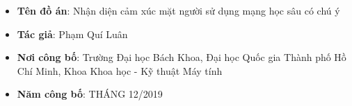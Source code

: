 \begin{itemize}
    \item \textbf{Tên đồ án}: Nhận diện cảm xúc mặt người sử dụng mạng học sâu có chú ý
    \item \textbf{Tác giả}: Phạm Quí Luân
    \item \textbf{Nơi công bố}: Trường Đại học Bách Khoa, Đại học Quốc gia Thành phố Hồ Chí Minh, Khoa Khoa học - Kỹ thuật Máy tính
    \item \textbf{Năm công bố}: THÁNG 12/2019
\end{itemize}